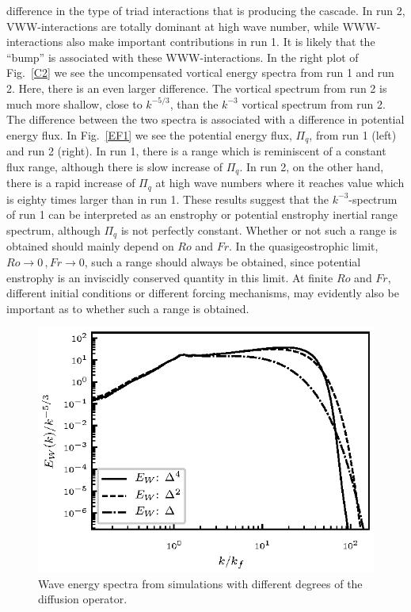 {difference in the type of triad interactions that is producing the cascade. In run 2,
VWW-interactions are totally dominant at high wave number, while WWW-interactions also
make important contributions in run 1. It is likely that the ``bump'' is associated with
these WWW-interactions. In the right plot of Fig.~\ref{C2} we see the uncompensated
vortical energy spectra from run 1 and run 2. Here, there is an even larger difference.
The vortical spectrum from run 2 is much more shallow, close to $ k^{-5/3} $,  than the
$ k^{-3} $ vortical spectrum from run 2. The difference between the two spectra is
associated with a difference in potential energy flux. In Fig.~\ref{EF1} we see the
potential energy flux, $ \Pi_q $,  from run 1 (left) and run 2 (right). In run 1,  there
is a range  which is reminiscent of a constant flux range, although there is slow
increase of  $ \Pi_q $. In run 2, on the other hand, there is a rapid increase of $
\Pi_q $ at high wave numbers where it reaches value which is eighty times larger than in
run 1. These results suggest that the $ k^{-3} $-spectrum of run 1 can be interpreted as
an enstrophy or potential enstrophy inertial range spectrum, although $ \Pi_q $ is not
perfectly constant. Whether or not such a range is obtained should mainly depend on $ Ro
$ and $ Fr $. In the quasigeostrophic limit, $ Ro \rightarrow 0 \, , Fr \rightarrow 0 $,
such a range should always be obtained, since potential enstrophy is an inviscidly
conserved quantity in this limit. At finite $ Ro $ and $ Fr $, different initial
conditions or different forcing mechanisms, may evidently also be important as to
whether such a range is obtained.}

\begin{figure}[h]
\centerline{\includegraphics[angle=0]{./fig4.eps}}
 \caption{Wave energy spectra from simulations with different degrees of the diffusion operator.  }
 \label{Comp1}
 \end{figure}
 
